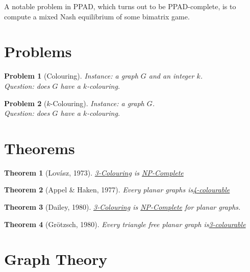 \documentclass[]{article}
\theoremstyle{break}
\theoremstyle{break}
\newtheorem{problem}{Problem}[section]
\newtheorem{theorem}{Theorem}[section]
\begin{document}
A notable problem in PPAD, which turns out to be PPAD-complete, is to compute a mixed Nash equilibrium of some bimatrix game.
\section{Problems}
\label{prob:colouring}
\begin{problem}[Colouring]
	\textit{Instance}: a graph $G$ and an integer $k$.
	\\
	\textit{Question}: does $G$ have a $k$-colouring.
\end{problem}
\label{prob:kcolouring}
\begin{problem}[$k$-Colouring]
	\textit{Instance}: a graph $G$.
	\\
	\textit{Question}: does $G$ have a $k$-colouring.
\end{problem}
\section{Theorems}
\begin{theorem}[Lov\'asz, 1973]
	\hyperref[prob:kcolouring]{3-Colouring} is \hyperref[sec:NP]{NP-Complete}
\end{theorem}
\begin{theorem}[Appel \& Haken, 1977]
	Every planar graphs is\hyperref[prob:kcolouring]{4-colourable} 
\end{theorem}
\begin{theorem}[Dailey, 1980]
	\hyperref[prob:kcolouring]{3-Colouring} is \hyperref[sec:NP]{NP-Complete} for planar graphs.
\end{theorem}
\begin{theorem}[Gr\"otzsch, 1980]
	Every triangle free planar graph is\hyperref[prob:kcolouring]{3-colourable} 
\end{theorem}
\section{Graph Theory}
\end{document}
